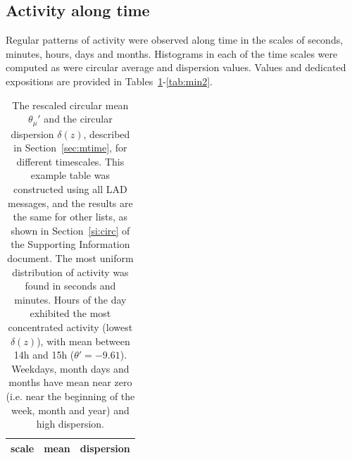 \documentclass[%
	aip,
	jmp,%
	amsmath,amssymb,
	reprint,%
]{revtex4-1}
\begin{document}
\subsection{Activity along time}\label{constDisc}
Regular patterns of activity were observed along time
in the scales of seconds, minutes, hours, days and months.
Histograms in each of the time scales were computed as were circular average and dispersion values.
Values and dedicated expositions are provided in Tables~\ref{tab:circ}-\ref{tab:min2}.

\begin{table}
	\caption{The rescaled circular mean $\theta_\mu'$ and the circular dispersion $\delta(z)$, described in Section~\ref{sec:mtime}, for different timescales.
		This example table was constructed using all LAD messages, and the results are the same for other lists, as shown in Section~\ref{si:circ} of the Supporting Information document.
	The most uniform distribution of activity was found in seconds and minutes.
	Hours of the day exhibited the most concentrated activity (lowest $\delta(z)$), with mean between 14h and 15h ($\theta'=-9.61$).
	Weekdays, month days and months have mean near zero (i.e. near the beginning of the week, month and year) and high dispersion.}
	\begin{center}
		\begin{tabular}{ |l|| c|c| }
			\hline
			{\bf scale} & {\bf mean} \boldsymbol{$\theta_\mu'$} & {\bf dispersion} \boldsymbol{$\delta(z)$ }  \\ \hline\hline
			
		\end{tabular}
	\end{center}
	\label{tab:circ}
\end{table}

\begin{table}
	\caption{Activity percentages along the hours of the day. Nearly identical distributions are found on other systems as shown in Section~\ref{si:hours} of the Supporting Information document.
	Higher activity was observed between noon and 6pm (with 1/3 of total day activity), followed by the time period between 6pm and midnight. Around 2/3 of the activity takes place from noon to midnight.
Nevertheless, the activity peak occurs between 11 a.m. and 12 p.m. This example and empirical table corresponds to the activity in CPP.}
	\footnotesize
	
	\label{tab:hin}
\end{table}
\end{document}
